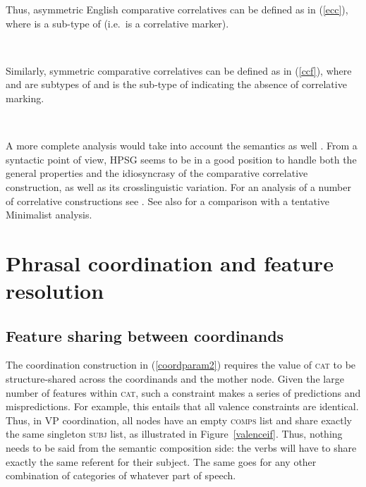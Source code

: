 Thus,  asymmetric English comparative correlatives  can be defined as
in (\ref{ecc}), where  is a sub-type of  (i.e.\ is a correlative marker).

\ea
\label{ecc}
 \impl\\ %
\z

\noindent
Similarly,  symmetric  comparative correlatives can be  defined as
in (\ref{ccf}), where  and  are subtypes of  and   is the sub-type of  indicating
the absence of  correlative marking.

\ea
\label{ccf}
 \impl\\ %
\z

A more complete analysis would take into account the semantics as well \citep[Section~5.5]{fgsag08}. From a syntactic point of view, HPSG seems to be in a good position to handle both the general properties and the idiosyncrasy of the comparative correlative construction, as well as its crosslinguistic variation. 
For an analysis of a number of  correlative constructions see \citet{Alqurashi:Borsley:14}.
See also  \citet{Borsley:11} for a comparison with a tentative Minimalist analysis.


\section{Phrasal coordination and feature resolution}

\subsection{Feature sharing between coordinands}

The coordination construction in (\ref{coordparam2}) requires the value of \textsc{cat} to be structure-shared across the coordinands and the mother node. Given the large number of features within \textsc{cat}, such a constraint makes a series of predictions and mispredictions.
For example, this entails that all valence constraints are identical. Thus, in VP coordination, all nodes have an empty \textsc{comps} list and share exactly the same singleton \textsc{subj} list, as illustrated in Figure~\ref{valenceif}. Thus, nothing needs to be said from the semantic composition side: the verbs will have to share exactly the same referent for their subject. The same goes for any other combination of categories of whatever part of speech.

